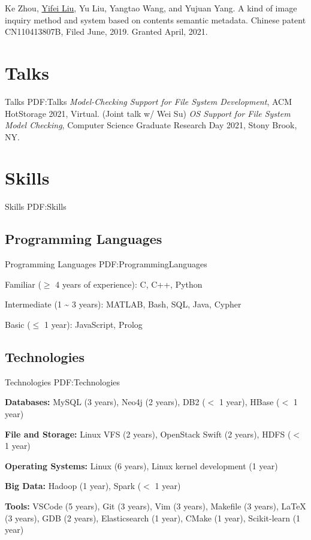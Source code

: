 \documentclass[letterpaper,10pt,oneside]{article}
\begin{document}
\begin{body}
\NumberedItem{[1]}
Ke Zhou, \underline{Yifei Liu}, Yu Liu, Yangtao Wang, and Yujuan Yang. A kind of image inquiry method and system based on contents semantic metadata. Chinese patent CN110413807B, Filed June, 2019. Granted April, 2021.


\section
{Talks}
{Talks}
{PDF:Talks}
\BulletItem
\emph{Model-Checking Support for File System Development}, ACM HotStorage 2021, Virtual. (Joint talk w/ Wei Su)
\BulletItem
\emph{OS Support for File System Model Checking}, 
Computer Science Graduate Research Day 2021, Stony Brook, NY.



\section
{Skills}
{Skills}
{PDF:Skills}

\subsection
{Programming Languages}
{Programming Languages}
{PDF:ProgrammingLanguages}

\BulletItem
Familiar ($\geq$ 4 years of experience): C, C++, Python

\BulletItem
Intermediate (1 {\textasciitilde} 3 years): MATLAB, Bash, SQL, Java, Cypher

\BulletItem
Basic ($\leq$ 1 year): JavaScript, Prolog


\subsection
{Technologies}
{Technologies}
{PDF:Technologies}

\BulletItem
\textbf{Databases:} MySQL (3 years), Neo4j (2 years), DB2 ($<$ 1 year), HBase ($<$ 1 year)

\BulletItem
\textbf{File and Storage:} Linux VFS (2 years), OpenStack Swift (2 years), HDFS ($<$ 1 year)

\BulletItem
\textbf{Operating Systems:} Linux (6 years), Linux kernel development (1 year)

\BulletItem
\textbf{Big Data:} Hadoop (1 year), Spark ($<$ 1 year)

\BulletItem
\textbf{Tools:} VSCode (5 years), Git (3 years), Vim (3 years), Makefile (3 years), {\LaTeX} (3 years), GDB (2 years), Elasticsearch (1 year), CMake (1 year), Scikit-learn (1 year)


\end{body}
\end{document}
